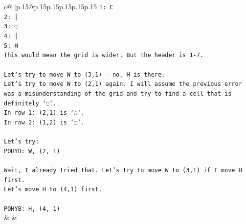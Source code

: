 \documentclass{article}
\begin{document}
{\begin{supertabular}{c@{$\;$}|p{.15\linewidth}@{}p{.15\linewidth}p{.15\linewidth}p{.15\linewidth}p{.15\linewidth}p{.15\linewidth}}
{{{\texttt{1: C} \\
\texttt{2: │} \\
\texttt{3: ◌} \\
\texttt{4: │} \\
\texttt{5: H} \\
\texttt{This would mean the grid is wider. But the header is 1{-}7.} \\
\\ 
\texttt{Let's try to move W to (3,1) {-} no, H is there.} \\
\texttt{Let's try to move W to (2,1) again. I will assume the previous error was a misunderstanding of the grid and try to find a cell that is definitely `◌`.} \\
\texttt{In row 1: (2,1) is `◌`.} \\
\texttt{In row 2: (1,2) is `◌`.} \\
\\ 
\texttt{Let's try:} \\
\texttt{POHYB: W, (2, 1)} \\
\\ 
\texttt{Wait, I already tried that. Let's try to move W to (3,1) if I move H first.} \\
\texttt{Let's move H to (4,1) first.} \\
\\ 
\texttt{POHYB: H, (4, 1)} \\
            }
        }
    }
    & & \\ \\


\end{supertabular}}
\end{document}
